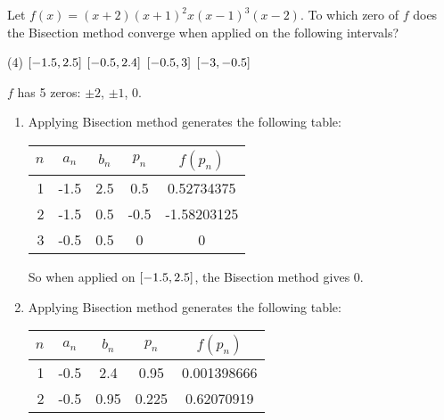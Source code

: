 \documentclass[../../../../Assignments.tex]{subfiles}
\begin{document}
\begin{exercise}
    Let \(f(x) = (x + 2) (x+1)^2 x (x - 1)^3 (x - 2)\). To which zero of \(f\)
    does the Bisection method converge when applied on the following intervals?

    \begin{tasks}(4)
        \task \(\interval{\num{-1.5}}{\num{2.5}}\)
        \task \(\interval{\num{-0.5}}{\num{2.4}}\)
        \task \(\interval{\num{-0.5}}{3}\)
        \task \(\interval{-3}{\num{-0.5}}\)
    \end{tasks}
\end{exercise}

\begin{solution}
    \(f\) has 5 zeros: \(\pm 2\), \(\pm 1\), \(0\).

    \begin{enumerate}[label = (\alph*)]
        \item Applying Bisection method generates the following table:

            \begin{table}[H]
                \centering
                \begin{tabular}{r S[table-format=-1.1] S[table-format=1.1] S[table-format=-1.1] S[table-format=-1.8]}
                    \toprule
                    \(n\)  &   {\(a_n\)}   &   {\(b_n\)}   &   {\(p_n\)}   &  {\(f(p_n)\)}  \\
                      &  -1.5         &  2.5          &   0.5         &   0.52734375   \\
                        2  &  -1.5         &  0.5          &  -0.5         &  -1.58203125   \\
                        3  &  -0.5         &  0.5          &   0           &   0            \\
                    \bottomrule
                \end{tabular}
            \end{table}

            So when applied on \(\interval{\num{-1.5}}{\num{2.5}}\), the
            Bisection method gives \(0\).

        \item Applying Bisection method generates the following table:

            \begin{table}[H]
                \centering
                \begin{tabular}{r S[table-format=-1.1] S[table-format=1.2] S[table-format=1.3] S[table-format=1.9]}
                    \toprule
                    \(n\)  &   {\(a_n\)}   &   {\(b_n\)}   &   {\(p_n\)}   &  {\(f(p_n)\)}  \\
                      &  -0.5         &  2.4          &  0.95         &  0.001398666   \\
                        2  &  -0.5         &  0.95         &  0.225        &  0.62070919    \\
                    \bottomrule
                \end{tabular}
            \end{table}


\end{enumerate}
\end{solution}
\end{document}
